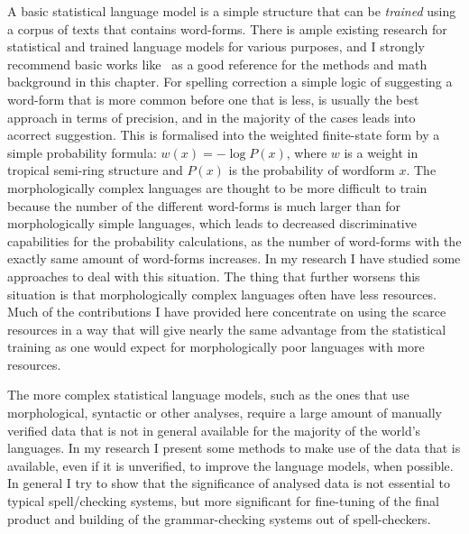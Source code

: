 \documentclass[officiallayout]{unihelcompling}
\begin{document}
A basic statistical language model is a simple structure that can be
\emph{trained} using a corpus of texts that contains word-forms. There is ample
existing research for statistical and trained language models for various
purposes, and I strongly recommend basic works
like~\citet{manning1999foundations} as a good reference for the methods and
math background in this chapter.  For spelling correction a simple logic of
suggesting a word-form that is more common before one that is less, is usually
the best approach in terms of precision, and in the majority of the cases leads
into acorrect suggestion. This is formalised into the weighted finite-state
form by a simple probability formula: $w(x) = -\log P(x)$, where $w$ is a
weight in tropical semi-ring structure and $P(x)$ is the probability of
wordform $x$.  The morphologically complex languages are thought to be more
difficult to train because the number of the different word-forms is much
larger than for morphologically simple languages, which leads to decreased
discriminative capabilities for the probability calculations, as the number of
word-forms with the exactly same amount of word-forms increases. In my research
I have studied some approaches to deal with this situation. The thing that
further worsens this situation is that morphologically complex languages often
have less resources.  Much of the contributions I have provided here
concentrate on using the scarce resources in a way that will give nearly the
same advantage from the statistical training as one would expect for
morphologically poor languages with more resources.

The more complex statistical language models, such as the ones that use
morphological, syntactic or other analyses, require a large amount of manually
verified data that is not in general available for the majority of the world's
languages. In my research I present some methods to make use of the data that
is available, even if it is unverified, to improve the language models, when
possible. In general I try to show that the significance of analysed data is
not essential to typical spell\-/checking systems, but more significant for
fine-tuning of the final product and building of the grammar-checking systems
out of spell-checkers.
\end{document}
